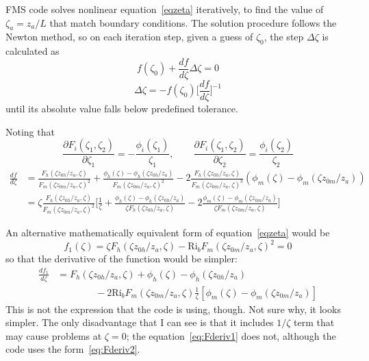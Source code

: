 \documentclass{article}
\newcommand{\pderiv}[2]{\frac{\partial #1}{\partial #2}} %
\newcommand{\fderiv}[2]{\frac{d #1}{d #2}} %
\newcommand{\zm}{z_{0m}} %
\newcommand{\zh}{z_{0h}} %
\newcommand{\fstab}{\phi} %
\newcommand{\rich}{\text{Ri}} %
\newcommand{\rbulk}{\rich_b} %
\begin{document}
FMS code solves nonlinear equation~\eqref{eqzeta} iteratively, to find the value of $\zeta_a = z_a/L$ that match boundary conditions. The solution procedure follows the Newton method, so on each iteration step, given a guess of $\zeta_0$, the step $\Delta \zeta$ is calculated as
\begin{equation}
   f(\zeta_0) + \fderiv{f}{\zeta} \Delta \zeta = 0
\end{equation}
\begin{equation}
   \Delta \zeta = - f(\zeta_0)\Big[\fderiv{f}{\zeta}\Big]^{-1}
\end{equation}
until its absolute value falls below predefined tolerance.

Noting that
\begin{equation}
    \pderiv{F_i(\zeta_1,\zeta_2)}{\zeta_1} = - \frac{\fstab_i(\zeta_1)}{\zeta_1}, \qquad
    \pderiv{F_i(\zeta_1,\zeta_2)}{\zeta_2} = \frac{\fstab_i(\zeta_2)}{\zeta_2}
\end{equation}
\begin{subequations}
\begin{align}
\fderiv{f}{\zeta}
    & =  \frac{F_h(\zeta \zh/z_a, \zeta)}{F_m(\zeta \zm/z_a,\zeta)^2}
    + \frac{\fstab_h(\zeta)-\fstab_h(\zeta \zh/z_a)}{F_m(\zeta \zm/z_a,\zeta)^2}
    - 2 \frac{F_h(\zeta \zh/z_a, \zeta)}{F_m(\zeta \zm/z_a,\zeta)^3}(\fstab_m(\zeta)-\fstab_m(\zeta \zm/z_a))
    \label{eq:Fderiv1}
    \\
    {} &=  \zeta\frac{F_h(\zeta \zh/z_a, \zeta)}{F_m(\zeta \zm/z_a,\zeta)^2}
        \Bigg[
            \frac{1}{\zeta}
            + \frac{\fstab_h(\zeta)-\fstab_h(\zeta \zh/z_a)}{\zeta F_h(\zeta \zh/z_a,\zeta)}
            - 2 \frac{\fstab_m(\zeta)-\fstab_m(\zeta \zm/z_a)}{\zeta F_m(\zeta \zm/z_a,\zeta)}
        \Bigg]
    \label{eq:Fderiv2}
\end{align}
\end{subequations}

\begin{mdframed}
An alternative mathematically equivalent form of equation~\eqref{eqzeta} would be
\begin{equation}
    f_1(\zeta) = \zeta F_h(\zeta \zh/z_a, \zeta) - \rbulk F_m(\zeta \zm/z_a,\zeta)^2 = 0
\end{equation}
so that the derivative of the function would be simpler:
\begin{equation}
    \begin{split}
    \fderiv{f_1}{\zeta} & = F_h(\zeta \zh/z_a, \zeta) + \fstab_h(\zeta)-\fstab_h(\zeta \zh/z_a) \\
    & \qquad \qquad - 2 \rbulk F_m(\zeta \zm/z_a,\zeta) \frac{1}{\zeta} [\fstab_m(\zeta)-\fstab_m(\zeta \zm/z_a)]
    \end{split}
\end{equation}
This is not the expression that the code is using, though. Not sure why, it looks simpler.
The only disadvantage that I can see is that it includes $1/\zeta$ term that may cause problems at $\zeta=0$; the equation~\eqref{eq:Fderiv1} does not, although the code uses the form~\eqref{eq:Fderiv2}.
\end{mdframed}
\end{document}
